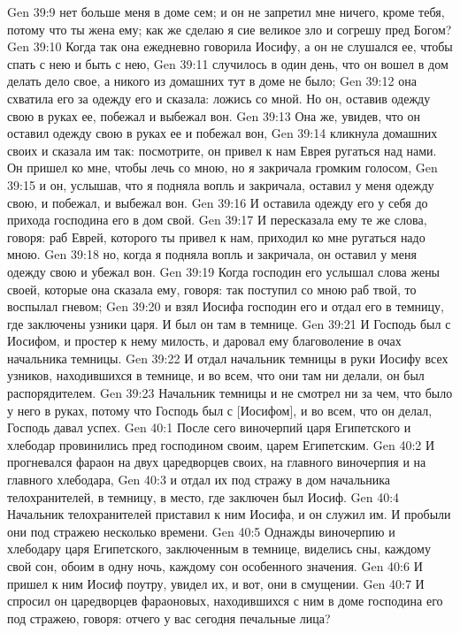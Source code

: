 Gen 39:9  нет больше меня в доме сем; и он не запретил мне ничего, кроме тебя, потому что ты жена ему; как же сделаю я сие великое зло и согрешу пред Богом?
Gen 39:10  Когда так она ежедневно говорила Иосифу, а он не слушался ее, чтобы спать с нею и быть с нею,
Gen 39:11  случилось в один день, что он вошел в дом делать дело свое, а никого из домашних тут в доме не было;
Gen 39:12  она схватила его за одежду его и сказала: ложись со мной. Но он, оставив одежду свою в руках ее, побежал и выбежал вон.
Gen 39:13  Она же, увидев, что он оставил одежду свою в руках ее и побежал вон,
Gen 39:14  кликнула домашних своих и сказала им так: посмотрите, он привел к нам Еврея ругаться над нами. Он пришел ко мне, чтобы лечь со мною, но я закричала громким голосом,
Gen 39:15  и он, услышав, что я подняла вопль и закричала, оставил у меня одежду свою, и побежал, и выбежал вон.
Gen 39:16  И оставила одежду его у себя до прихода господина его в дом свой.
Gen 39:17  И пересказала ему те же слова, говоря: раб Еврей, которого ты привел к нам, приходил ко мне ругаться надо мною.
Gen 39:18  но, когда я подняла вопль и закричала, он оставил у меня одежду свою и убежал вон.
Gen 39:19  Когда господин его услышал слова жены своей, которые она сказала ему, говоря: так поступил со мною раб твой, то воспылал гневом;
Gen 39:20  и взял Иосифа господин его и отдал его в темницу, где заключены узники царя. И был он там в темнице.
Gen 39:21  И Господь был с Иосифом, и простер к нему милость, и даровал ему благоволение в очах начальника темницы.
Gen 39:22  И отдал начальник темницы в руки Иосифу всех узников, находившихся в темнице, и во всем, что они там ни делали, он был распорядителем.
Gen 39:23  Начальник темницы и не смотрел ни за чем, что было у него в руках, потому что Господь был с [Иосифом], и во всем, что он делал, Господь давал успех.
Gen 40:1  После сего виночерпий царя Египетского и хлебодар провинились пред господином своим, царем Египетским.
Gen 40:2  И прогневался фараон на двух царедворцев своих, на главного виночерпия и на главного хлебодара,
Gen 40:3  и отдал их под стражу в дом начальника телохранителей, в темницу, в место, где заключен был Иосиф.
Gen 40:4  Начальник телохранителей приставил к ним Иосифа, и он служил им. И пробыли они под стражею несколько времени.
Gen 40:5  Однажды виночерпию и хлебодару царя Египетского, заключенным в темнице, виделись сны, каждому свой сон, обоим в одну ночь, каждому сон особенного значения.
Gen 40:6  И пришел к ним Иосиф поутру, увидел их, и вот, они в смущении.
Gen 40:7  И спросил он царедворцев фараоновых, находившихся с ним в доме господина его под стражею, говоря: отчего у вас сегодня печальные лица?
